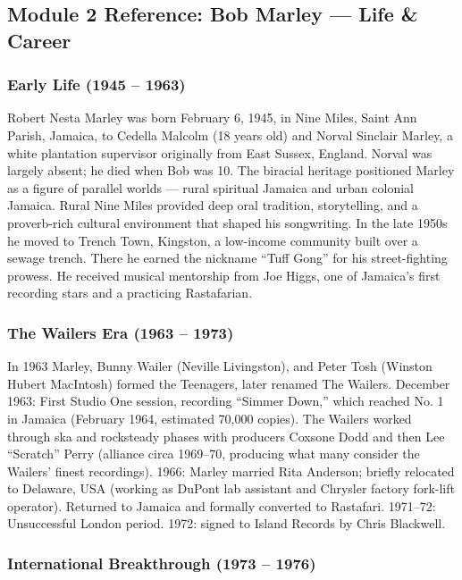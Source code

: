 \documentclass[11pt,letterpaper]{article}
\begin{document}
\subsection{Module 2 Reference: Bob Marley --- Life \& Career}

\subsubsection{Early Life (1945 -- 1963)}

Robert Nesta Marley was born February 6, 1945, in Nine Miles, Saint Ann Parish, Jamaica, to Cedella Malcolm (18 years old) and Norval Sinclair Marley, a white plantation supervisor originally from East Sussex, England. Norval was largely absent; he died when Bob was 10. The biracial heritage positioned Marley as a figure of parallel worlds --- rural spiritual Jamaica and urban colonial Jamaica. Rural Nine Miles provided deep oral tradition, storytelling, and a proverb-rich cultural environment that shaped his songwriting. In the late 1950s he moved to Trench Town, Kingston, a low-income community built over a sewage trench. There he earned the nickname ``Tuff Gong'' for his street-fighting prowess. He received musical mentorship from Joe Higgs, one of Jamaica's first recording stars and a practicing Rastafarian.

\subsubsection{The Wailers Era (1963 -- 1973)}

In 1963 Marley, Bunny Wailer (Neville Livingston), and Peter Tosh (Winston Hubert MacIntosh) formed the Teenagers, later renamed The Wailers. December 1963: First Studio One session, recording ``Simmer Down,'' which reached No. 1 in Jamaica (February 1964, estimated 70,000 copies). The Wailers worked through ska and rocksteady phases with producers Coxsone Dodd and then Lee ``Scratch'' Perry (alliance circa 1969--70, producing what many consider the Wailers' finest recordings). 1966: Marley married Rita Anderson; briefly relocated to Delaware, USA (working as DuPont lab assistant and Chrysler factory fork-lift operator). Returned to Jamaica and formally converted to Rastafari. 1971--72: Unsuccessful London period. 1972: signed to Island Records by Chris Blackwell.

\subsubsection{International Breakthrough (1973 -- 1976)}
\end{document}
